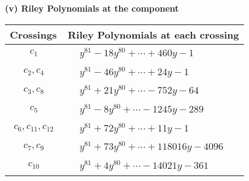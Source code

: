 \documentclass[1p]{elsarticle_modified}
\theoremstyle{definition}
\begin{document}
\newpage\renewcommand{\arraystretch}{1}
\flushleft \textbf{(v) Riley Polynomials at the component}\newline \\
\begin{tabular}{m{50pt}|m{274pt}}
Crossings & \hspace{64pt}Riley Polynomials at each crossing \\
\hline $$\begin{aligned}c_{1}\end{aligned}$$&$\begin{aligned}
&y^{81}-18 y^{80}+\cdots+460 y-1
\end{aligned}$\\
\hline $$\begin{aligned}c_{2},c_{4}\end{aligned}$$&$\begin{aligned}
&y^{81}-46 y^{80}+\cdots+24 y-1
\end{aligned}$\\
\hline $$\begin{aligned}c_{3},c_{8}\end{aligned}$$&$\begin{aligned}
&y^{81}+21 y^{80}+\cdots-752 y-64
\end{aligned}$\\
\hline $$\begin{aligned}c_{5}\end{aligned}$$&$\begin{aligned}
&y^{81}-8 y^{80}+\cdots-1245 y-289
\end{aligned}$\\
\hline $$\begin{aligned}c_{6},c_{11},c_{12}\end{aligned}$$&$\begin{aligned}
&y^{81}+72 y^{80}+\cdots+11 y-1
\end{aligned}$\\
\hline $$\begin{aligned}c_{7},c_{9}\end{aligned}$$&$\begin{aligned}
&y^{81}+73 y^{80}+\cdots+118016 y-4096
\end{aligned}$\\
\hline $$\begin{aligned}c_{10}\end{aligned}$$&$\begin{aligned}
&y^{81}+4 y^{80}+\cdots-14021 y-361
\end{aligned}$\\
\hline
\end{tabular}\\~\\
\end{document}
